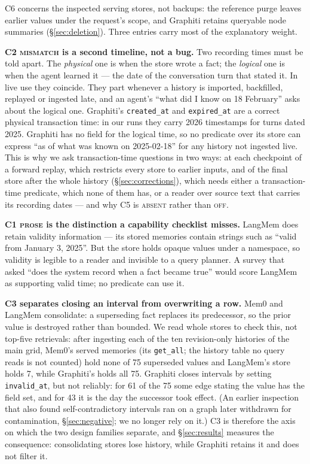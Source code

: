 \documentclass[conference]{IEEEtran}
\begin{document}
C6 concerns the inspected serving stores, not backups: the reference purge
leaves earlier values under the request's scope, and Graphiti retains queryable
node summaries (\S\ref{sec:deletion}). Three entries carry most of the
explanatory weight.

\textbf{C2 \textsc{mismatch} is a second timeline, not a bug.} Two recording
times must be told apart. The \emph{physical} one is when the store wrote a
fact; the \emph{logical} one is when the agent learned it --- the date of the
conversation turn that stated it. In live use they coincide. They part whenever
a history is imported, backfilled, replayed or ingested late, and an agent's
``what did I know on 18 February'' asks about the logical one. Graphiti's
\texttt{created\_at} and \texttt{expired\_at} are a correct physical
transaction time: in our runs they carry 2026 timestamps for turns dated 2025.
Graphiti has no field for the logical time, so no predicate over its store can
express ``as of what was known on 2025-02-18'' for any history not ingested
live. This is why we ask transaction-time questions in two ways: at each
checkpoint of a forward replay, which restricts every store to earlier inputs,
and of the final store after the whole history (\S\ref{sec:corrections}), which
needs either a transaction-time predicate, which none of them has, or a reader
over source text that carries its recording dates --- and why C5 is \textsc{absent} rather
than \textsc{off}.

\textbf{C1 \textsc{prose} is the distinction a capability checklist misses.}
LangMem does retain validity information --- its stored memories contain strings
such as ``valid from January 3, 2025''. But the store holds opaque values under
a namespace, so validity is legible to a reader and invisible to a query
planner. A survey that asked ``does the system record when a fact became true''
would score LangMem as supporting valid time; no predicate can use it.

\textbf{C3 separates closing an interval from overwriting a row.} Mem0 and
LangMem consolidate: a superseding fact replaces its predecessor, so the prior
value is destroyed rather than bounded. We read whole stores to check this,
not top-five retrievals: after ingesting each of the ten revision-only histories
of the main grid, Mem0's served memories (its \texttt{get\_all}; the history
table no query reads is not counted) hold none of 75 superseded values and
LangMem's store holds 7, while Graphiti's holds all 75. Graphiti closes intervals by setting
\texttt{invalid\_at}, but not reliably: for 61 of the 75 some edge stating the
value has the field set, and for 43 it is the day the successor took effect. (An
earlier inspection that also found self-contradictory intervals ran on a graph
later withdrawn for contamination, \S\ref{sec:negative}; we no longer rely on
it.) C3 is therefore the axis on which the two design families separate, and
\S\ref{sec:results} measures the consequence: consolidating stores lose
history, while Graphiti retains it and does not filter it.
\end{document}
